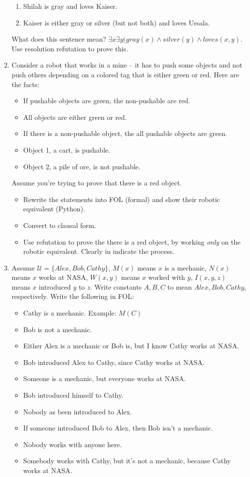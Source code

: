 \documentclass{article}
\begin{document}
\begin{enumerate}
\begin{enumerate}
\item Shilah is gray and loves Kaiser.
\item Kaiser is either gray or silver (but not both) and loves Ursala.
\end{enumerate}
What does this sentence mean? $\exists x \exists y (gray(x) \wedge silver(y) \wedge loves(x,y)$.  Use resolution refutation to prove this.
\item Consider a robot that works in a mine -- it has to push some objects and not push others depending on a colored tag that is either green or red.  Here are the facts:
\begin{itemize}
\item If pushable objects are green, the non-pushable are red.
\item All objects are either green or red.
\item If there is a non-pushable object, the all pushable objects are green.
\item Object 1, a cart, is pushable.
\item Object 2, a pile of ore, is not pushable. 
\end{itemize}
Assume you're trying to prove that there is a red object. 
\begin{itemize}
\item Rewrite the statements into FOL (formal) and show their robotic equivalent (Python).
\item Convert to clausal form.
\item Use refutation to prove the there is a red object, by working {\it only} on the robotic equivalent.  Clearly in indicate the process.
\end{itemize}
\item Assume $\mathcal{U} = \{Alex, Bob, Cathy\}$, $M(x)$ means $x$ is a mechanic, $N(x)$ means $x$ works at NASA, $W(x,y)$ means $x$ worked with $y$, $I(x,y,z)$ means $x$ introduced $y$ to $z$.  Write constants $A,B,C$ to mean $Alex, Bob, Cathy$, respectively. Write the following in FOL:
\begin{itemize}
\item Cathy is a mechanic. Example:  $M(C)$
\item Bob is not a mechanic.
\item Either Alex is a mechanic or Bob is, but I know Cathy works at NASA.
\item Bob introduced Alex to Cathy, since Cathy works at NASA.
\item Someone is a mechanic, but everyone works at NASA.
\item Bob introduced himself to Cathy.
\item Nobody as been introduced to Alex.
\item If someone introduced Bob to Alex, then Bob isn't a mechanic.
\item Nobody works with anyone here.
\item Somebody works with Cathy, but it's not a mechanic, because Cathy works at NASA.
\end{itemize}
\end{enumerate}
\end{document}
